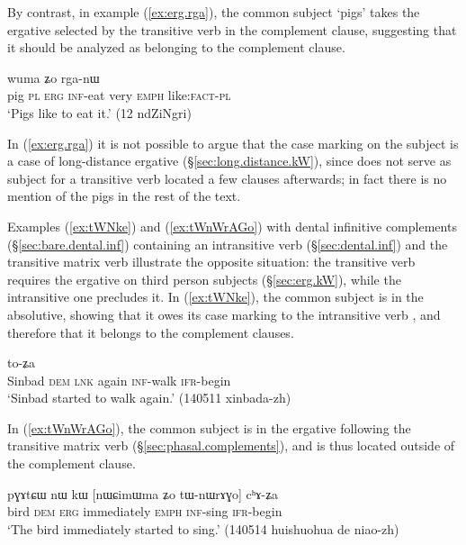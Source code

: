 By contrast, in example (\ref{ex:erg.rga}), the common subject   `pigs' takes the ergative  selected by the transitive verb   in the complement clause, suggesting that it should be analyzed as belonging to the complement clause.

\begin{exe}
\ex \label{ex:erg.rga}
 wuma ʑo rga-nɯ \\
pig \textsc{pl} \textsc{erg} \textsc{inf}-eat very \textsc{emph}  like:\textsc{fact}-\textsc{pl} \\
 \glt `Pigs like to eat it.' (12 ndZiNgri)
\end{exe}

In (\ref{ex:erg.rga}) it is not possible to argue that the case marking on the subject is a case of long-distance ergative (§\ref{sec:long.distance.kW}), since   does not serve as subject for a transitive verb located a few clauses afterwards; in fact there is no mention of the pigs in the rest of the text.


Examples (\ref{ex:tWNke}) and (\ref{ex:tWnWrAGo}) with dental infinitive complements (§\ref{sec:bare.dental.inf}) containing an intransitive verb (§\ref{sec:dental.inf}) and the transitive matrix verb  illustrate the opposite situation: the transitive verb requires the ergative on third person subjects (§\ref{sec:erg.kW}), while the intransitive one precludes it. In (\ref{ex:tWNke}), the common subject is in the absolutive, showing that it owes its case marking to the intransitive verb , and therefore that it belongs to the complement clauses.

\begin{exe}
\ex \label{ex:tWNke}
 to-ʑa \\
Sinbad \textsc{dem} \textsc{lnk} again  \textsc{inf}-walk \textsc{ifr}-begin \\
\glt `Sinbad started to walk again.' (140511 xinbada-zh)
\end{exe}

In (\ref{ex:tWnWrAGo}), the common subject is in the ergative following the transitive matrix verb  (§\ref{sec:phasal.complements}), and is thus located outside of the complement clause.


\begin{exe}
\ex \label{ex:tWnWrAGo}
\gll pɣɤtɕɯ nɯ kɯ [nɯɕimɯma ʑo tɯ-nɯrɤɣo] cʰɤ-ʑa \\
bird \textsc{dem} \textsc{erg} immediately \textsc{emph} \textsc{inf}-sing \textsc{ifr}-begin \\
\glt `The bird immediately started to sing.' (140514 huishuohua de niao-zh)
\end{exe}

